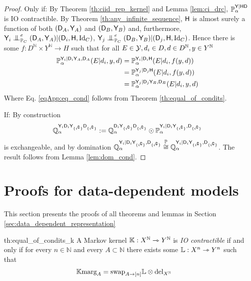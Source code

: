 \begin{proof}
Only if: By Theorem \ref{th:ciid_rep_kernel} and Lemma \ref{lem:ci_drc}, $\mathbb{P}_\alpha^{\mathsf{Y}|\mathsf{HD}}$ is IO contractible. By Theorem \ref{th:any_infinite_sequence}, $\mathsf{H}$ is almost surely a function of both $(\mathsf{D}_A,\mathsf{Y}_A)$ and $(\mathsf{D}_B,\mathsf{Y}_B)$ and, furthermore, $\RV{Y}_i\CI_{\prob{P}_C}^e (\RV{D}_A,\RV{Y}_A)|(\RV{D}_i,\RV{H},\text{Id}_C)$, $\RV{Y}_j\CI_{\prob{P}_C}^e (\RV{D}_B,\RV{Y}_B)|(\RV{D}_j,\RV{H},\text{Id}_C)$. Hence there is some $f:D^{\mathbb{N}}\times Y^{\mathbb{N}}\to H$ such that for all $E\in \mathcal{Y}, d_i\in D, d\in D^{\mathbb{N}}, y\in Y^{\mathbb{N}}$
\begin{align}
    \mathbb{P}_\alpha^{\mathsf{Y}_i|\mathsf{D}_i\mathsf{Y}_A,\mathsf{D}_A}(E|d_i,y,d) &= \mathbb{P}_\alpha^{\mathsf{Y}_i|\mathsf{D}_i\mathsf{H}}(E|d_i,f(y,d))\\
     &= \mathbb{P}_\alpha^{\mathsf{Y}_j|\mathsf{D}_j\mathsf{H}}(E|d_i,f(y,d))\label{eqApp:eq_cond}\\
     &= \mathbb{P}_\alpha^{\mathsf{Y}_j|\mathsf{D}_j\mathsf{Y}_B,\mathsf{D}_B}(E|d_i,y,d)
\end{align}
Where Eq. \eqref{eqApp:eq_cond} follows from Theorem \ref{th:equal_of_condits}.

If:
By construction
\begin{align}
    \mathbb{Q}_\alpha^{\mathsf{Y}_i\mathsf{D}_i\mathsf{Y}_{\{i^{\complement}\}}\mathsf{D}_{\{i^{\complement}\}}}:=\mathbb{Q}_\alpha^{\mathsf{D}_i\mathsf{Y}_{\{i^{\complement}\}}\mathsf{D}_{\{i^{\complement}\}}}\odot \mathbb{P}_\alpha^{\mathsf{Y}_i|\mathsf{D}_i\mathsf{Y}_{\{i^{\complement}\}},\mathsf{D}_{\{i^{\complement}\}}}
\end{align}
is exchangeable, and by domination $\mathbb{Q}_\alpha^{\mathsf{Y}_i|\mathsf{D}_i\mathsf{Y}_{\{i^{\complement}\}},\mathsf{D}_{\{i^{\complement}\}}}\overset{\mathbb{P}}{\cong}\mathbb{Q}_\alpha^{\mathsf{Y}_i|\mathsf{D}_i\mathsf{Y}_{\{i^{\complement}\}},\mathsf{D}_{\{i^{\complement}\}}}$. The result follows from Lemma \ref{lem:dom_cond}.
\end{proof}

\section{Proofs for data-dependent models}\label{sec:data_dep_proofs}

This section presents the proofs of all theorems and lemmas in Section \ref{sec:data_dependent_representation}

\begin{reptheorem}{th:equal_of_condits_k}
A Markov kernel $\mathbb{K}:X^{\mathbb{N}}\rightarrowtriangle Y^{\mathbb{N}}$ is \emph{IO contractible} if and only if for every $n\in \mathbb{N}$ and every $A\subset\mathbb{N}$ there exists some $\mathbb{L}:X^n\rightarrowtriangle Y^n$ such that
\begin{align}
    \mathbb{K} \text{marg}_A &= \text{swap}_{A\rightarrow [n]} \mathbb{L}\otimes \text{del}_{X^{\mathbb{N}}}
\end{align}
\end{reptheorem}


